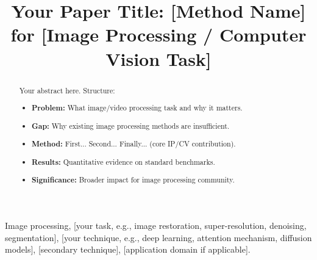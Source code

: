 \documentclass[journal,onecolumn,draftcls]{IEEEtran}
\begin{document}
\title{Your Paper Title: [Method Name] for [Image Processing / Computer Vision Task]}

\author{
}

\maketitle

\begin{abstract}

%

Your abstract here. Structure:
\begin{itemize}
  \item \textbf{Problem:} What image/video processing task and why it matters.
  \item \textbf{Gap:} Why existing image processing methods are insufficient.
  \item \textbf{Method:} First... Second... Finally... (core IP/CV contribution).
  \item \textbf{Results:} Quantitative evidence on standard benchmarks.
  \item \textbf{Significance:} Broader impact for image processing community.
\end{itemize}

\end{abstract}

\begin{IEEEkeywords}
  Image processing, [your task, e.g., image restoration, super-resolution,
  denoising, segmentation], [your technique, e.g., deep learning, attention
  mechanism, diffusion models], [secondary technique],
  [application domain if applicable].
\end{IEEEkeywords}
\end{document}

